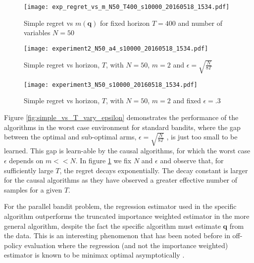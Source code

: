 \begin{figure}
  \centering
  \begin{minipage}[b]{0.3\textwidth}
    \texttt{[image: exp\_regret\_vs\_m\_N50\_T400\_s10000\_20160518\_1534.pdf]}
    \caption{Simple regret vs $m(\boldsymbol{q})$ for fixed horizon $T=400$ and number of variables $N = 50$}
    \label{fig:simple_vs_m}
  \end{minipage}
  \hfill
  \begin{minipage}[b]{0.3\textwidth}
    \texttt{[image: experiment2\_N50\_a4\_s10000\_20160518\_1534.pdf]}
    \caption{Simple regret vs horizon, $T$, with $N = 50$, $m=2$ and $\epsilon = \sqrt{\frac{N}{8T}}$}
    \label{fig:simple_vs_T_vary_epsilon}
  \end{minipage}
  \hfill
  \begin{minipage}[b]{0.3\textwidth}
    \texttt{[image: experiment3\_N50\_s10000\_20160518\_1534.pdf]}
    \caption{Simple regret vs horizon, $T$, with $N = 50$, $m=2$ and fixed $\epsilon = .3$}
    \label{fig:simple_vs_T}
  \end{minipage}
\end{figure}


Figure \ref{fig:simple_vs_T_vary_epsilon} demonstrates the performance of the algorithms in the worst case environment for standard bandits, where the gap between the optimal and sub-optimal arms, $\epsilon = \sqrt{\frac{N}{8T}}$ , is just too small to be learned. This gap is learn-able by the causal algorithms, for which the worst case $\epsilon$ depends on $m << N$. In figure \ref{fig:simple_vs_T} we fix $N$ and $\epsilon$ and observe that, for sufficiently large $T$, the regret decays exponentially. The decay constant is larger for the causal algorithms as they have observed a greater effective number of samples for a given $T$. 

For the parallel bandit problem, the regression estimator used in the specific algorithm outperforms the truncated importance weighted estimator in the more general algorithm, despite the fact the specific algorithm must estimate $\boldsymbol{q}$ from the data. 
This is an interesting phenomenon that has been noted before in off-policy evaluation where the regression (and not the importance weighted) estimator is known to be minimax optimal asymptotically \citep{LMS14}.

